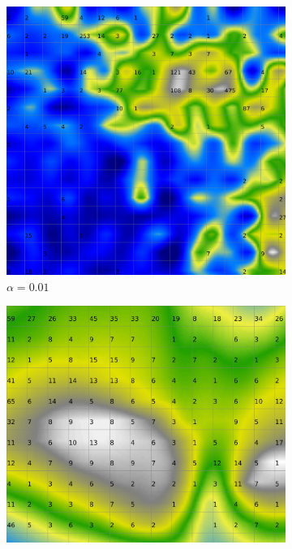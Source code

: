 \documentclass{acm_proc_article-sp}
\begin{document}
\begin{figure}
\centering
    \centering
    \begin{subfigure}[b]{0.24\linewidth}
        \includegraphics[width=\linewidth]{img/wine-20x16-smoothed-data-histogram-alpha-0.01-f-100}
        \caption{$\alpha=0.01$}
        \label{fig:wine-20x16-smoothed-data-histogram-alpha-0.01-f-100}
    \end{subfigure}
    \begin{subfigure}[b]{0.24\linewidth}
        \includegraphics[width=\linewidth]{img/wine-20x16-smoothed-data-histogram-alpha-0.45-f-100}

\end{subfigure}
\end{figure}
\end{document}
